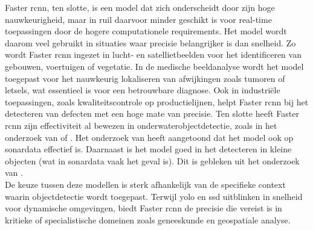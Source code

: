 \clearpage

Faster \gls{rcnn}, ten slotte, is een model dat zich onderscheidt door zijn hoge nauwkeurigheid, maar in ruil daarvoor minder geschikt is voor real-time toepassingen door de hogere computationele requirements. Het model wordt daarom veel gebruikt in situaties waar precisie belangrijker is dan snelheid. Zo wordt Faster \gls{rcnn} ingezet in lucht- en satellietbeelden voor het identificeren van gebouwen, voertuigen of vegetatie. In de medische beeldanalyse wordt het model toegepast voor het nauwkeurig lokaliseren van afwijkingen zoals tumoren of letsels, wat essentieel is voor een betrouwbare diagnose. Ook in industriële toepassingen, zoals kwaliteitscontrole op productielijnen, helpt Faster \gls{rcnn} bij het detecteren van defecten met een hoge mate van precisie. Ten slotte heeft Faster \gls{rcnn} zijn effectiviteit al bewezen in onderwaterobjectdetectie, zoals in het onderzoek van \textcite{Wang_2023} of \textcite{Zeng_2021}. Het onderzoek van \textcite{Yulin_2020} heeft aangetoond dat het model ook op sonardata effectief is. Daarnaast is het model goed in het detecteren in kleine objecten (wat in sonardata vaak het geval is). Dit is gebleken uit het onderzoek van \textcite{Chen_2017}. \\

De keuze tussen deze modellen is sterk afhankelijk van de specifieke context waarin objectdetectie wordt toegepast. Terwijl \gls{yolo} en \gls{ssd} uitblinken in snelheid voor dynamische omgevingen, biedt Faster \gls{rcnn} de precisie die vereist is in kritieke of specialistische domeinen zoals geneeskunde en geospatiale analyse.